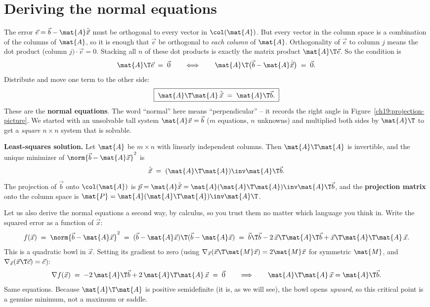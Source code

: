 \section{Deriving the normal equations}

The error $\vec{e}=\vec{b}-\mat{A}\hat{\vec{x}}$ must be orthogonal to every vector in
$\col(\mat{A})$. But every vector in the column space is a combination of the columns of
$\mat{A}$, so it is enough that $\vec{e}$ be orthogonal to \emph{each column} of $\mat{A}$.
Orthogonality of $\vec{e}$ to column $j$ means the dot product (column $j)\cdot\vec{e}=0$. Stacking
all $n$ of these dot products is exactly the matrix product $\mat{A}\T\vec{e}$. So the condition is
\[
  \mat{A}\T\vec{e} \;=\; \vec{0}
  \qquad\Longleftrightarrow\qquad
  \mat{A}\T\bigl(\vec{b}-\mat{A}\hat{\vec{x}}\bigr) \;=\; \vec{0}.
\]
Distribute and move one term to the other side:
\[
  \boxed{\;\mat{A}\T\mat{A}\,\hat{\vec{x}} \;=\; \mat{A}\T\vec{b}.\;}
\]
These are the \textbf{normal equations}. The word ``normal'' here means ``perpendicular'' -- it
records the right angle in Figure~\ref{ch19:projection-picture}. We started with an unsolvable tall
system $\mat{A}\vec{x}=\vec{b}$ ($m$ equations, $n$ unknowns) and multiplied both sides by
$\mat{A}\T$ to get a \emph{square} $n\times n$ system that is solvable.

\begin{formalbox}
\textbf{Least-squares solution.} Let $\mat{A}$ be $m\times n$ with linearly independent columns.
Then $\mat{A}\T\mat{A}$ is invertible, and the unique minimizer of $\norm{\vec{b}-\mat{A}\vec{x}}^2$
is
\[
  \hat{\vec{x}} \;=\; (\mat{A}\T\mat{A})\inv \mat{A}\T\vec{b}.
\]
The projection of $\vec{b}$ onto $\col(\mat{A})$ is $\vec{p}=\mat{A}\hat{\vec{x}}
=\mat{A}(\mat{A}\T\mat{A})\inv\mat{A}\T\vec{b}$, and the \textbf{projection matrix} onto the column
space is $\mat{P}=\mat{A}(\mat{A}\T\mat{A})\inv\mat{A}\T$.
\end{formalbox}

Let us also derive the normal equations a second way, by calculus, so you trust them no matter
which language you think in. Write the squared error as a function of $\vec{x}$:
\[
  f(\vec{x}) \;=\; \norm{\vec{b}-\mat{A}\vec{x}}^2
  \;=\; (\vec{b}-\mat{A}\vec{x})\T(\vec{b}-\mat{A}\vec{x})
  \;=\; \vec{b}\T\vec{b} - 2\,\vec{x}\T\mat{A}\T\vec{b} + \vec{x}\T\mat{A}\T\mat{A}\,\vec{x}.
\]
This is a quadratic bowl in $\vec{x}$. Setting its gradient to zero (using
$\nabla_{\vec{x}}(\vec{x}\T\mat{M}\vec{x})=2\mat{M}\vec{x}$ for symmetric $\mat{M}$, and
$\nabla_{\vec{x}}(\vec{x}\T\vec{c})=\vec{c}$):
\[
  \nabla f(\vec{x}) \;=\; -2\,\mat{A}\T\vec{b} + 2\,\mat{A}\T\mat{A}\,\vec{x} \;=\; \vec{0}
  \qquad\Longrightarrow\qquad
  \mat{A}\T\mat{A}\,\vec{x} = \mat{A}\T\vec{b}.
\]
Same equations. Because $\mat{A}\T\mat{A}$ is positive semidefinite (it is, as we will see), the
bowl opens \emph{upward}, so this critical point is a genuine minimum, not a maximum or saddle.

